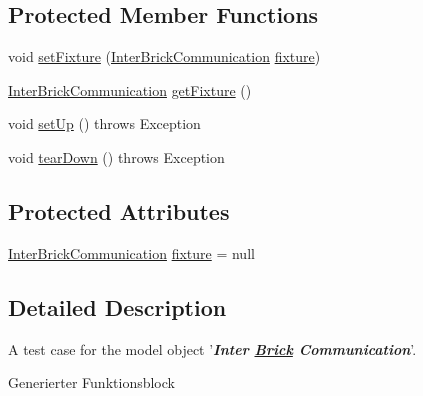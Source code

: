 \subsection*{Protected Member Functions}
\begin{DoxyCompactItemize}
\item 
void \hyperlink{classshootingmachineemfmodel_1_1tests_1_1_inter_brick_communication_test_afeb01eb6b35335d5da74b555c0835ec9}{set\-Fixture} (\hyperlink{interfaceshootingmachineemfmodel_1_1_inter_brick_communication}{Inter\-Brick\-Communication} \hyperlink{classshootingmachineemfmodel_1_1tests_1_1_inter_brick_communication_test_a3c96face58bd8ec1152f83fe367b7644}{fixture})
\item 
\hyperlink{interfaceshootingmachineemfmodel_1_1_inter_brick_communication}{Inter\-Brick\-Communication} \hyperlink{classshootingmachineemfmodel_1_1tests_1_1_inter_brick_communication_test_aa8010cef7ac6657eefa5211c9f0da71e}{get\-Fixture} ()
\item 
void \hyperlink{classshootingmachineemfmodel_1_1tests_1_1_inter_brick_communication_test_acc383ab8c47d145a3bd05a21be8e7bbd}{set\-Up} ()  throws Exception 
\item 
void \hyperlink{classshootingmachineemfmodel_1_1tests_1_1_inter_brick_communication_test_a81b4f5581fb16e82bd354f19d4937f0c}{tear\-Down} ()  throws Exception 
\end{DoxyCompactItemize}
\subsection*{Protected Attributes}
\begin{DoxyCompactItemize}
\item 
\hyperlink{interfaceshootingmachineemfmodel_1_1_inter_brick_communication}{Inter\-Brick\-Communication} \hyperlink{classshootingmachineemfmodel_1_1tests_1_1_inter_brick_communication_test_a3c96face58bd8ec1152f83fe367b7644}{fixture} = null
\end{DoxyCompactItemize}


\subsection{Detailed Description}
A test case for the model object '{\itshape {\bfseries Inter \hyperlink{interfaceshootingmachineemfmodel_1_1_brick}{Brick} Communication}}'.

Generierter Funktionsblock 

